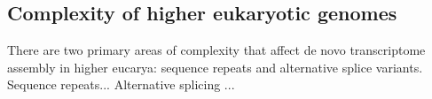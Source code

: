 \documentclass[10pt]{article}
\begin{document}




\subsection*{Complexity of higher eukaryotic genomes}

There are two primary areas of complexity that affect de novo transcriptome assembly in higher eucarya: sequence repeats and alternative splice variants.  Sequence repeats... Alternative splicing ...


\end{document}
